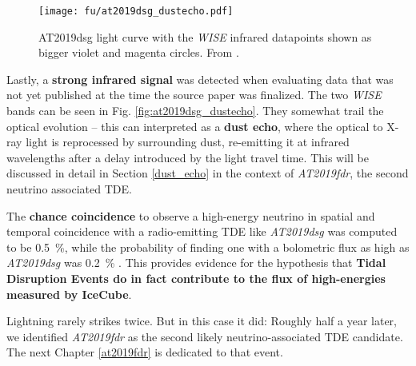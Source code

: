 \begin{figure}[htb]
    \texttt{[image: fu/at2019dsg\_dustecho.pdf]}
    \caption[AT2019dsg infrared light curve]{AT2019dsg light curve with the \textit{WISE} infrared datapoints shown as bigger violet and magenta circles. From \cite{Reusch2023b}.}
\end{figure}

Lastly, a \textbf{strong infrared signal} was detected when evaluating   data that was not yet published at the time the source paper was finalized. The two \textit{WISE} bands can be seen in Fig. \ref{fig:at2019dsg_dustecho}. They somewhat trail the optical evolution -- this can interpreted as a \textbf{dust echo}, where the optical to X-ray light is reprocessed by surrounding dust, re-emitting it at infrared wavelengths after a delay introduced by the light travel time. This will be discussed in detail in Section \ref{dust_echo} in the context of \emph{AT2019fdr}, the second neutrino associated TDE.

The \textbf{chance coincidence} to observe a high-energy neutrino in spatial and temporal coincidence with a radio-emitting TDE like \emph{AT2019dsg} was computed to be \SI{0.5}{\percent}, while the probability of finding one with a bolometric flux as high as \emph{AT2019dsg} was \SI{0.2}{\percent} \cite{Stein2021}. This provides evidence for the hypothesis that \textbf{Tidal Disruption Events do in fact contribute to the flux of high-energies measured by IceCube}.

Lightning rarely strikes twice. But in this case it did: Roughly half a year later, we identified \emph{AT2019fdr} as the second likely neutrino-associated TDE candidate. The next Chapter \ref{at2019fdr} is dedicated to that event.
